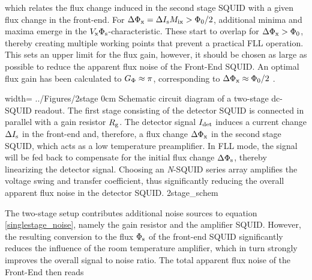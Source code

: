 
which relates the flux change induced in the second stage SQUID with a given flux change in the front-end. For $\Delta\Phi_{\rm x}=\Delta I_{\rm s}M_{\rm ix}>\Phi_0/2$, additional minima and maxima emerge in the $V_{\rm x}\Phi_{\rm s}$-characteristic. These start to overlap for $\Delta\Phi_{\rm x}>\Phi_0$, thereby creating multiple working points that prevent a practical FLL operation. This sets an upper limit for the flux gain, however, it should be chosen as large as possible to reduce the apparent flux noise of the Front-End SQUID. An optimal flux gain has been calculated to $G_{\rm \Phi}\approx\pi$, corresponding to $\Delta\Phi_{\rm x}\approx\Phi_0/2$ \cite{Drung1996a}.

{width=\textwidth}
{../Figures/2stage}
{0cm}
{Schematic circuit diagram of a two-stage dc-SQUID readout. The first stage consisting of the detector SQUID is connected in parallel with a gain resistor $R_{\rm g}$. The detector signal $I_{\rm det}$ induces a current change $\Delta I_{\rm s}$ in the front-end and, therefore, a flux change $\Delta\Phi_{\rm x}$ in the second stage SQUID, which acts as a low temperature preamplifier. In FLL mode, the signal will be fed back to compensate for the initial flux change $\Delta\Phi_{\rm s}$, thereby linearizing the detector signal. Choosing an \textit{N}-SQUID series array amplifies the voltage swing and transfer coefficient, thus significantly reducing the overall apparent flux noise in the detector SQUID.} 
{2stage_schem}

The two-stage setup contributes additional noise sources to equation \ref{singlestage_noise}, namely the gain resistor and the amplifier SQUID. However, the resulting conversion to the flux $\Phi_{\rm s}$ of the front-end SQUID significantly reduces the influence of the room temperature amplifier, which in turn strongly improves the overall signal to noise ratio. The total apparent flux noise of the Front-End then reads \cite{Drung1996a}


